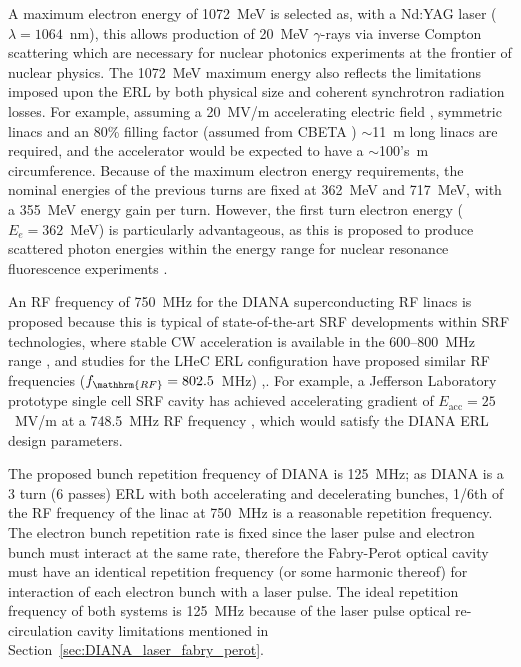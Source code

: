 \documentclass[../main.tex]{subfiles}
\begin{document}
A maximum electron energy of 1072~\si{\mega\electronvolt} is selected as, with a Nd:YAG laser ($\lambda=1064$~\si{\nano\meter}), this allows production of 20~\si{\mega\electronvolt} $\gamma$-rays via inverse Compton scattering which are necessary for nuclear photonics experiments\cite{budker2021expanding} at the frontier of nuclear physics. The 1072~\si{\mega\electronvolt} maximum energy also reflects the limitations imposed upon the ERL by both physical size and coherent synchrotron radiation losses. For example, assuming a 20~\si{\mega\volt}/\si{\meter} accelerating electric field \cite{ben2006review}, symmetric linacs and an 80\% filling factor (assumed from CBETA \cite{hoffstaetter2017cbeta}) $\sim$11~\si{\meter} long linacs are required, and the accelerator would be expected to have a $\sim$100's~\si{\meter} circumference. Because of the maximum electron energy requirements, the nominal energies of the previous turns are fixed at 362~\si{\mega\electronvolt} and 717~\si{\mega\electronvolt}, with a 355~\si{\mega\electronvolt} energy gain per turn. However, the first turn electron energy ($E_{e}=362$~\si{\mega\electronvolt}) is particularly advantageous, as this is proposed to produce scattered photon energies within the energy range for nuclear resonance fluorescence experiments \cite{angell2015demonstration,quiter2011transmission}.   

An RF frequency of 750~\si{\mega\hertz} for the DIANA superconducting RF linacs is proposed because this is typical of state-of-the-art SRF developments within SRF technologies, where stable CW acceleration is available in the 600--800~\si{\mega\hertz} range \cite{calaga2013proposal}, and studies for the LHeC ERL configuration have proposed similar RF frequencies ($f_{\mathhrm{RF}}=802.5$~\si{\mega\hertz}) \cite{agostini2021large},. For example, a Jefferson Laboratory prototype single cell SRF cavity has achieved accelerating gradient of $E_{\mathrm{acc}}=25$~\si{\mega\volt}/\si{\meter} at a 748.5~\si{\mega\hertz} RF frequency \cite{rimmer2007jlab}, which would satisfy the DIANA ERL design parameters. 

The proposed bunch repetition frequency of DIANA is 125~\si{\mega\hertz}; as DIANA is a 3 turn (6 passes) ERL with both accelerating and decelerating bunches, 1/6th of the RF frequency of the linac at 750~\si{\mega\hertz} is a reasonable repetition frequency. The electron bunch repetition rate is fixed since the laser pulse and electron bunch must interact at the same rate, therefore the Fabry-Perot optical cavity must have an identical repetition frequency (or some harmonic thereof) for interaction of each electron bunch with a laser pulse. The ideal repetition frequency of both systems is 125~\si{\mega\hertz} because of the laser pulse optical re-circulation cavity limitations mentioned in Section~\ref{sec:DIANA_laser_fabry_perot}.
\end{document}
